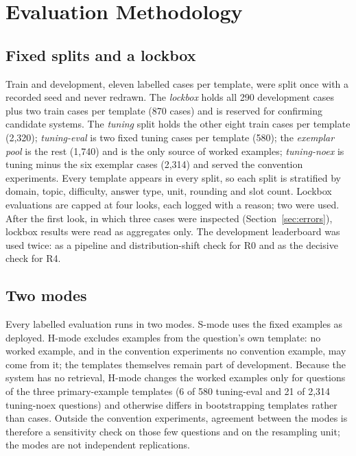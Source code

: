 \documentclass[conference]{IEEEtran}
\begin{document}
\section{Evaluation Methodology}\label{sec:method}

\subsection{Fixed splits and a lockbox}\label{sec:splits}
Train and development, eleven labelled cases per template, were split once with a recorded seed and never redrawn. The \emph{lockbox} holds all 290 development cases plus two train cases per template (870 cases) and is reserved for confirming candidate systems. The \emph{tuning} split holds the other eight train cases per template (2,320); \emph{tuning-eval} is two fixed tuning cases per template (580); the \emph{exemplar pool} is the rest (1,740) and is the only source of worked examples; \emph{tuning-noex} is tuning minus the six exemplar cases (2,314) and served the convention experiments. Every template appears in every split, so each split is stratified by domain, topic, difficulty, answer type, unit, rounding and slot count. Lockbox evaluations are capped at four looks, each logged with a reason; two were used. After the first look, in which three cases were inspected (Section~\ref{sec:errors}), lockbox results were read as aggregates only. The development leaderboard was used twice: as a pipeline and distribution-shift check for R0 and as the decisive check for R4.

\subsection{Two modes}
Every labelled evaluation runs in two modes. S-mode uses the fixed examples as deployed. H-mode excludes examples from the question's own template: no worked example, and in the convention experiments no convention example, may come from it; the templates themselves remain part of development. Because the system has no retrieval, H-mode changes the worked examples only for questions of the three primary-example templates (6 of 580 tuning-eval and 21 of 2,314 tuning-noex questions) and otherwise differs in bootstrapping templates rather than cases. Outside the convention experiments, agreement between the modes is therefore a sensitivity check on those few questions and on the resampling unit; the modes are not independent replications.
\end{document}
